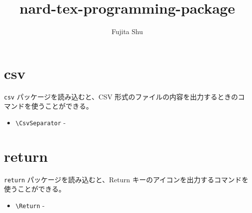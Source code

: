 \documentclass[oneside,10pt,a4paper]{jsarticle}
\title{nard-tex-programming-package}
\author{Fujita Shu}
\begin{document}
  \maketitle

  \section{csv}

  \verb|csv| パッケージを読み込むと、CSV 形式のファイルの内容を出力するときのコマンドを使うことができる。

  \begin{itemize}
    \item \verb|\CsvSeparator| - \CsvSeparator
  \end{itemize}

  \section{return}

  \verb|return| パッケージを読み込むと、Return キーのアイコンを出力するコマンドを使うことができる。

  \begin{itemize}
    \item \verb|\Return| - \Return
  \end{itemize}
\end{document}
